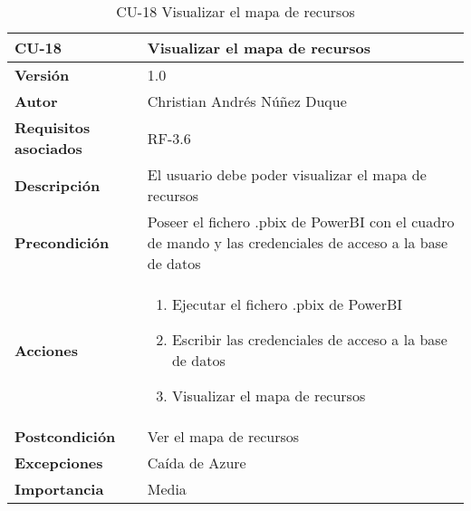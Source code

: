 \begin{table}[p]
	\centering
	\begin{tabularx}{\linewidth}{ p{} p{} }
		\toprule
		\textbf{CU-18}    & \textbf{Visualizar el mapa de recursos}\\
		\toprule
		\textbf{Versión}              & 1.0    \\
		\textbf{Autor}                & Christian Andrés Núñez Duque \\
		\textbf{Requisitos asociados} & RF-3.6 \\
		\textbf{Descripción}          & El usuario debe poder visualizar el mapa de recursos \\
		\textbf{Precondición}         & Poseer el fichero .pbix de PowerBI con el cuadro de mando y las credenciales de acceso a la base de datos \\
		\textbf{Acciones}             &
		\begin{enumerate}
			\def\labelenumi{\arabic{enumi}.}
			\tightlist
			\item Ejecutar el fichero .pbix de PowerBI
			\item Escribir las credenciales de acceso a la base de datos
			\item Visualizar el mapa de recursos
		\end{enumerate}\\
		\textbf{Postcondición}        & Ver el mapa de recursos \\
		\textbf{Excepciones}          & Caída de Azure \\
		\textbf{Importancia}          & Media \\
		\bottomrule
	\end{tabularx}
	\caption{CU-18 Visualizar el mapa de recursos}
\end{table}

